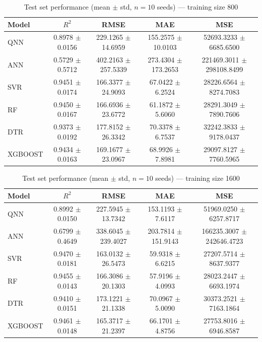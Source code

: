 \begin{table}[htbp]
\centering
\caption{Test set performance (mean $\pm$ std, $n=10$ seeds) — training size 800}
\label{tab:results_800}
\begin{tabular}{lcccc}
\toprule
Model & $R^2$ & RMSE & MAE & MSE \\
\midrule
QNN & 0.8978 $\pm$ 0.0156 & 229.1265 $\pm$ 14.6959 & 155.2575 $\pm$ 10.0103 & 52693.3233 $\pm$ 6685.6500 \\
ANN & 0.5729 $\pm$ 0.5712 & 402.2163 $\pm$ 257.5339 & 273.4304 $\pm$ 173.2653 & 221469.3011 $\pm$ 298108.8499 \\
SVR & 0.9451 $\pm$ 0.0174 & 166.3377 $\pm$ 24.9093 & 67.0422 $\pm$ 6.2524 & 28226.6564 $\pm$ 8274.7083 \\
RF & 0.9450 $\pm$ 0.0167 & 166.6936 $\pm$ 23.6772 & 61.1872 $\pm$ 5.6060 & 28291.3049 $\pm$ 7890.7606 \\
DTR & 0.9373 $\pm$ 0.0192 & 177.8152 $\pm$ 26.3342 & 70.3378 $\pm$ 6.7537 & 32242.3833 $\pm$ 9178.0437 \\
XGBOOST & 0.9434 $\pm$ 0.0163 & 169.1677 $\pm$ 23.0967 & 68.9926 $\pm$ 7.8981 & 29097.8127 $\pm$ 7760.5965 \\
\bottomrule
\end{tabular}
\end{table}

\begin{table}[htbp]
\centering
\caption{Test set performance (mean $\pm$ std, $n=10$ seeds) — training size 1600}
\label{tab:results_1600}
\begin{tabular}{lcccc}
\toprule
Model & $R^2$ & RMSE & MAE & MSE \\
\midrule
QNN & 0.8992 $\pm$ 0.0150 & 227.5945 $\pm$ 13.7342 & 153.1193 $\pm$ 7.6117 & 51969.0250 $\pm$ 6257.8717 \\
ANN & 0.6799 $\pm$ 0.4649 & 338.6045 $\pm$ 239.4027 & 203.7814 $\pm$ 151.9143 & 166235.3007 $\pm$ 242646.4723 \\
SVR & 0.9470 $\pm$ 0.0181 & 163.0132 $\pm$ 26.5473 & 59.9318 $\pm$ 6.6215 & 27207.5714 $\pm$ 8637.9377 \\
RF & 0.9455 $\pm$ 0.0143 & 166.3086 $\pm$ 20.1303 & 57.9196 $\pm$ 4.0993 & 28023.2447 $\pm$ 6693.1974 \\
DTR & 0.9410 $\pm$ 0.0151 & 173.1221 $\pm$ 21.1338 & 70.0967 $\pm$ 5.0090 & 30373.2521 $\pm$ 7163.1864 \\
XGBOOST & 0.9461 $\pm$ 0.0148 & 165.3717 $\pm$ 21.2397 & 66.1701 $\pm$ 4.8756 & 27753.8016 $\pm$ 6946.8587 \\
\bottomrule
\end{tabular}
\end{table}

